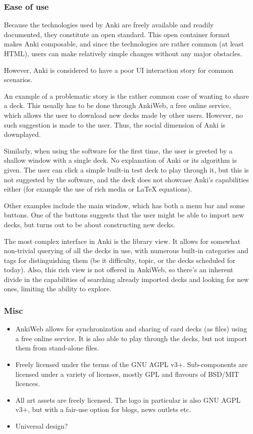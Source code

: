\subsubsection{Ease of use}

Because the technologies used by Anki are freely available and readily
documented, they constitute an open standard. This open container format makes
Anki composable, and since the technologies are rather common (at least HTML),
users can make relatively simple changes without any major obstacles.

However, Anki is considered to have a poor UI interaction story for common
scenarios\cite{pcworldanki}.

An example of a problematic story is the rather common case of wanting to share
a deck. This usually has to be done through AnkiWeb, a free online service, 
which allows the user to download new decks made by other users. However, no such
suggestion is made to the user. Thus, the social dimension of Anki is 
downplayed.

Similarly, when using the software for the first time, the user is greeted by 
a shallow window with a single deck. No explanation of Anki or its algorithm 
is given. The user can click a simple built-in test deck to play through it, 
but this is not suggested by the software, and the deck does not showcase 
Anki's capabilities either (for example the use of rich media or LaTeX 
equations).

Other examples include the main window, which has both a menu bar and some
buttons. One of the buttons suggests that the user might be able to import new
decks, but turns out to be about constructing new decks.

The most complex interface in Anki is the library view. It allows for somewhat
non-trivial querying of all the decks in use, with numerous built-in categories
and tags for distinguishing them (be it difficulty, topic, or the decks
scheduled for today). Also, this rich view is not offered in AnkiWeb, so there's
an inherent divide in the capabilities of searching already imported decks and
looking for new ones, limiting the ability to explore.

\subsubsection{Misc}

\begin{itemize}
\item AnkiWeb allows for synchronization and sharing of card decks (as files) using
  a free online service. It is also able to play through the decks, but not
  import them from stand-alone files.
\item Freely licensed under the terms of the GNU AGPL v3+. Sub-components are
  licensed under a variety of licenses, mostly GPL and flavours of BSD/MIT 
  licences.
\item All art assets are freely licensed. The logo in particular is also GNU AGPL
  v3+, but with a fair-use option for blogs, news outlets etc.
\item Universal design? %
\end{itemize}

